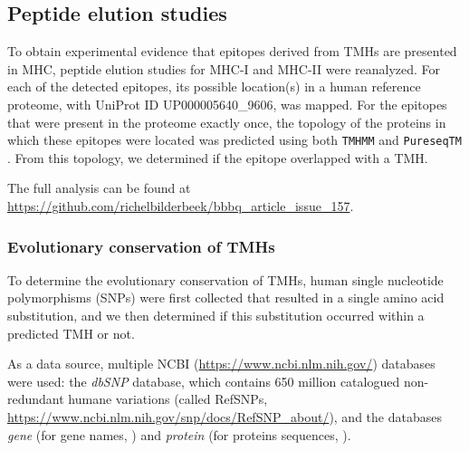 \subsection{Peptide elution studies}\label{subsec:elution_studies}

To obtain experimental evidence that epitopes derived from TMHs are presented in MHC, 
peptide elution studies for MHC-I \cite{schellens2015comprehensive} 
and MHC-II \cite{bergseng2015different} were reanalyzed.
For each of the detected epitopes,
its possible location(s) in 
a human reference proteome,
with UniProt ID UP000005640\_9606, was mapped.
For the epitopes that were present in the proteome exactly once,
the topology of the proteins in which these epitopes were located 
was predicted using both \verb;TMHMM; \cite{krogh2001predicting} 
and \verb;PureseqTM; \cite{wang2019efficient}. 
From this topology, we determined if the epitope
overlapped with a TMH.

The full analysis can be found
at \url{https://github.com/richelbilderbeek/bbbq_article_issue_157}.

\subsubsection{Evolutionary conservation of TMHs}


To determine the evolutionary conservation of TMHs,
human single nucleotide polymorphisms (SNPs) were first collected
that resulted in a single amino acid substitution,
and we then determined if this substitution occurred within a predicted TMH or not.


As a data source, multiple
NCBI (\url{https://www.ncbi.nlm.nih.gov/}) databases were used: 
the \emph{dbSNP} \cite{sherry2001dbsnp} database,
which contains 650 million 
catalogued non-redundant humane variations (called RefSNPs,
\url{https://www.ncbi.nlm.nih.gov/snp/docs/RefSNP_about/}), and the databases \emph{gene} (for gene names, \cite{brown2015gene})
and \emph{protein} (for proteins sequences, \cite{sayers2010database}).

